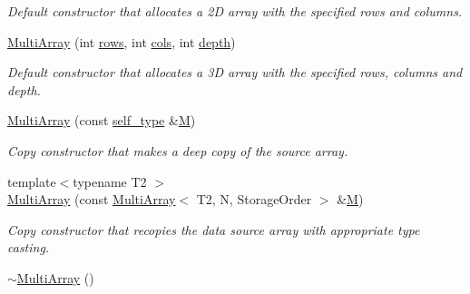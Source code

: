 \begin{DoxyCompactItemize}
\begin{DoxyCompactList}\small\item\em Default constructor that allocates a 2\-D array with the specified rows and columns. \end{DoxyCompactList}\item 
\hypertarget{class_d_o_1_1_multi_array_a8009a5ab280ef118a93962a538f023db}{\hyperlink{class_d_o_1_1_multi_array_a8009a5ab280ef118a93962a538f023db}{Multi\-Array} (int \hyperlink{class_d_o_1_1_multi_array_a48cdd99e4e82f74c1adae2bd69970220}{rows}, int \hyperlink{class_d_o_1_1_multi_array_a3cefa469a7524d4bbc80531ebb9b5df4}{cols}, int \hyperlink{class_d_o_1_1_multi_array_a3275d1392d01b26af1c8cd52b0d10745}{depth})}\label{class_d_o_1_1_multi_array_a8009a5ab280ef118a93962a538f023db}

\begin{DoxyCompactList}\small\item\em Default constructor that allocates a 3\-D array with the specified rows, columns and depth. \end{DoxyCompactList}\item 
\hypertarget{class_d_o_1_1_multi_array_a50b55fece94eb8d5bb64c267a3ab54fc}{\hyperlink{class_d_o_1_1_multi_array_a50b55fece94eb8d5bb64c267a3ab54fc}{Multi\-Array} (const \hyperlink{class_d_o_1_1_multi_array}{self\-\_\-type} \&\hyperlink{struct_d_o_1_1_m}{M})}\label{class_d_o_1_1_multi_array_a50b55fece94eb8d5bb64c267a3ab54fc}

\begin{DoxyCompactList}\small\item\em Copy constructor that makes a deep copy of the source array. \end{DoxyCompactList}\item 
\hypertarget{class_d_o_1_1_multi_array_aff00de73e78f6b4e9c3f534bfc4afeb9}{{\footnotesize template$<$typename T2 $>$ }\\\hyperlink{class_d_o_1_1_multi_array_aff00de73e78f6b4e9c3f534bfc4afeb9}{Multi\-Array} (const \hyperlink{class_d_o_1_1_multi_array}{Multi\-Array}$<$ T2, N, Storage\-Order $>$ \&\hyperlink{struct_d_o_1_1_m}{M})}\label{class_d_o_1_1_multi_array_aff00de73e78f6b4e9c3f534bfc4afeb9}

\begin{DoxyCompactList}\small\item\em Copy constructor that recopies the data source array with appropriate type casting. \end{DoxyCompactList}\item 
\hypertarget{class_d_o_1_1_multi_array_ae67638f4b1e3885c9308aac696c195fa}{\hyperlink{class_d_o_1_1_multi_array_ae67638f4b1e3885c9308aac696c195fa}{$\sim$\-Multi\-Array} ()}\label{class_d_o_1_1_multi_array_ae67638f4b1e3885c9308aac696c195fa}


\end{DoxyCompactItemize}
